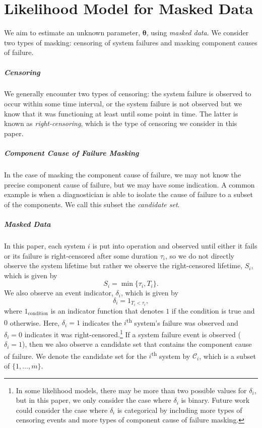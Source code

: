 \documentclass[
]{article}
\theoremstyle{definition}
\theoremstyle{plain}
\theoremstyle{definition}
\theoremstyle{definition}
\theoremstyle{definition}
\theoremstyle{definition}
\theoremstyle{remark}
\begin{document}
\hypertarget{like-model}{%
\section{Likelihood Model for Masked Data}\label{like-model}}

We aim to estimate an unknown parameter, \(\boldsymbol{\theta}\), using \emph{masked data}.
We consider two types of masking: censoring of system failures and masking
component causes of failure.

\hypertarget{censoring}{%
\subparagraph*{Censoring}\label{censoring}}

We generally encounter two types of censoring: the system failure is observed
to occur within some time interval, or the system failure is not observed
but we know that it was functioning at least until some point in time. The
latter is known as \emph{right-censoring}, which is the type of censoring we consider
in this paper.

\hypertarget{component-cause-of-failure-masking}{%
\subparagraph*{Component Cause of Failure Masking}\label{component-cause-of-failure-masking}}

In the case of masking the component cause of failure, we may not know the
precise component cause of failure, but we may have some indication. A common
example is when a diagnostician is able to isolate the cause of failure to a
subset of the components. We call this subset the \emph{candidate set}.

\hypertarget{masked-data}{%
\subparagraph*{Masked Data}\label{masked-data}}

In this paper, each system \(i\) is put into operation and observed until either it
fails or its failure is right-censored after some duration \(\tau_i\), so we do not
directly observe the system lifetime but rather we observe the right-censored
lifetime, \(S_i\), which is given by
\begin{equation}
    S_i = \min\{\tau_i, T_i\}.
\end{equation}
We also observe an event indicator, \(\delta_i\), which is given by
\begin{equation}
    \delta_i = 1_{T_i < \tau_i},
\end{equation}
where \(1_{\text{condition}}\) is an indicator function that denotes \(1\) if
the condition is true and \(0\) otherwise.
Here, \(\delta_i = 1\) indicates the \(i\)\textsuperscript{th} system's failure was
observed and \(\delta_i = 0\) indicates it was right-censored.\footnote{In some likelihood models, there may be more than two possible values
  for \(\delta_i\), but in this paper, we only consider the case where \(\delta_i\) is
  binary. Future work could consider the case where \(\delta_i\) is categorical by
  including more types of censoring events and more types of component cause of
  failure masking.}
If a system failure event is observed (\(\delta_i = 1\)), then we also observe a
candidate set that contains the component cause of failure. We denote the
candidate set for the \(i\)\textsuperscript{th} system by \(\mathcal{C}_i\), which
is a subset of \(\{1,\ldots,m\}\).
\end{document}
